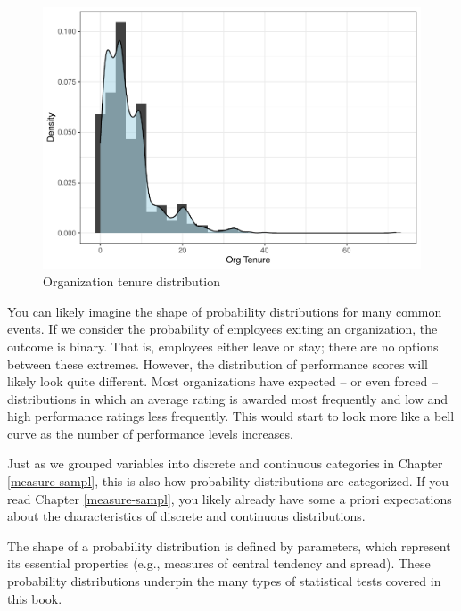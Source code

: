 \documentclass[
]{book}
\begin{document}
\begin{figure}

{\centering \includegraphics{The_Fundamentals_of_People_Analytics_files/figure-latex/org-tenure-dist-1} 

}

\caption{Organization tenure distribution}\label{fig:org-tenure-dist}
\end{figure}

You can likely imagine the shape of probability distributions for many common events. If we consider the probability of employees exiting an organization, the outcome is binary. That is, employees either leave or stay; there are no options between these extremes. However, the distribution of performance scores will likely look quite different. Most organizations have expected -- or even forced -- distributions in which an average rating is awarded most frequently and low and high performance ratings less frequently. This would start to look more like a bell curve as the number of performance levels increases.

Just as we grouped variables into discrete and continuous categories in Chapter \ref{measure-sampl}, this is also how probability distributions are categorized. If you read Chapter \ref{measure-sampl}, you likely already have some a priori expectations about the characteristics of discrete and continuous distributions.

The shape of a probability distribution is defined by parameters, which represent its essential properties (e.g., measures of central tendency and spread). These probability distributions underpin the many types of statistical tests covered in this book.
\end{document}
